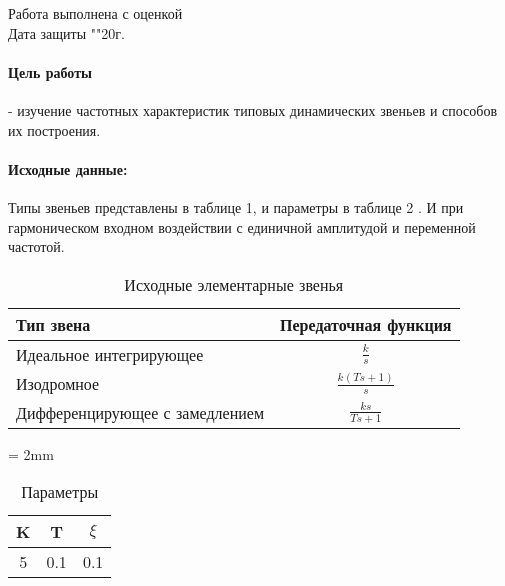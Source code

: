 \documentclass[a4paper, 12pt]{article}
\begin{document}
\begin{titlepage}
	Работа выполнена с оценкой \hspace{1cm} \underline{\hspace{8cm}} \\ 
	\vspace{1cm}
	Дата защиты "\underline{\hspace{0.7cm}}"\hspace{0.2cm}\underline{\hspace{2cm}}\hspace{0.2cm}20\underline{\hspace{0.7cm}}г.
	
\end{titlepage}


\paragraph{Цель работы} - изучение частотных характеристик типовых динамических звеньев и способов их построения. \par

\paragraph {Исходные данные:} Типы звеньев представлены в таблице 1, и параметры в таблице 2 . И при гармоническом входном воздействии с единичной амплитудой и переменной частотой.

\begin{table}[H]
	\centering
	\begin{threeparttable}
		\caption{Исходные элементарные звенья}
		\begin{tabular} {|l|c|}
			\hline
			Тип звена & Передаточная функция \\ [0.5cm]  \hline
			Идеальное интегрирующее    & $\displaystyle\frac{k}{s}$ \\ [0.5cm]  \hline
			Изодромное & $\displaystyle\frac{k(Ts + 1)}{s}$ \\ [0.5cm]  \hline
			Дифференцирующее с замедлением & $\displaystyle\frac{ks}{Ts + 1}$ \\ [0.5cm] \hline
		\end{tabular}
	\end{threeparttable} 
\end{table}

\begin{table}[h]
	\tabulinesep = 2mm
	\centering
	\begin{threeparttable}
		\caption{Параметры}\label{tab:perflogcross}
		\begin{tabular}{|c|c|c|}
			\hline
			K & T & $\xi$ \\ \hline
			5 & 0.1 & 0.1 \\
			\hline
		\end{tabular}
	\end{threeparttable} 
\end{table}
\end{document}
